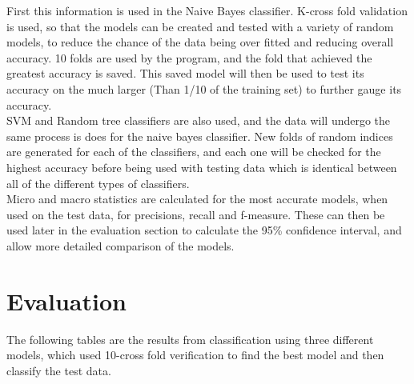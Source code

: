 \documentclass[11pt]{article}
\begin{document}
First this information is used in the Naive Bayes classifier. K-cross fold validation is used, so that the models can be created and tested with a variety of random models, to reduce the chance of the data being over fitted and reducing overall accuracy. 10 folds are used by the program, and the fold that achieved the greatest accuracy is saved. This saved model will then be used to test its accuracy on the much larger (Than 1/10 of the training set) to further gauge its accuracy. \\

SVM and Random tree classifiers are also used, and the data will undergo the same process is does for the naive bayes classifier. New folds of random indices are generated for each of the classifiers, and each one will be checked for the highest accuracy before being used with testing data which is identical between all of the different types of classifiers. \\

Micro and macro statistics are calculated for the most accurate models, when used on the test data, for precisions, recall and f-measure. These can then be used later in the evaluation section to calculate the 95\% confidence interval, and allow more detailed comparison of the models. \\

\section{Evaluation}
The following tables are the results from classification using three different models, which used 10-cross fold verification to find the best model and then classify the test data.
\end{document}
